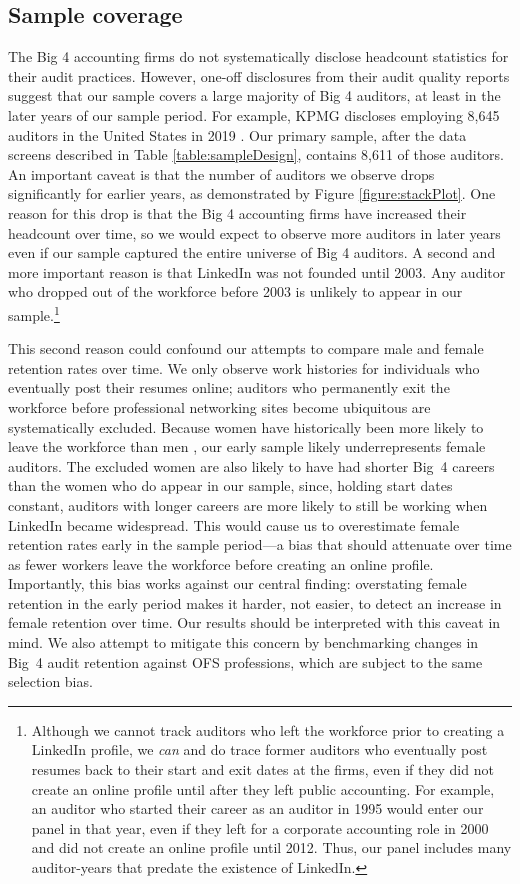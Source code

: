\documentclass[11pt]{article}
\begin{document}
    \subsection{Sample coverage}\label{section:sampleCoverage}
        The Big 4 accounting firms do not systematically disclose headcount statistics for their audit practices. However, one-off disclosures from their audit quality reports suggest that our sample covers a large majority of Big 4 auditors, at least in the later years of our sample period. For example, KPMG discloses employing 8,645 auditors in the United States in 2019 \parencite{kpmg2022ApproachAudit2022}. Our primary sample, after the data screens described in Table \ref{table:sampleDesign}, contains 8,611 of those auditors. An important caveat is that the number of auditors we observe drops significantly for earlier years, as demonstrated by Figure \ref{figure:stackPlot}. One reason for this drop is that the Big 4 accounting firms have increased their headcount over time, so we would expect to observe more auditors in later years even if our sample captured the entire universe of Big 4 auditors. A second and more important reason is that LinkedIn was not founded until 2003. Any auditor who dropped out of the workforce before 2003 is unlikely to appear in our sample.\footnote{Although we cannot track auditors who left the workforce prior to creating a LinkedIn profile, we \textit{can} and do trace former auditors who eventually post resumes back to their start and exit dates at the firms, even if they did not create an online profile until after they left public accounting. For example, an auditor who started their career as an auditor in 1995 would enter our panel in that year, even if they left for a corporate accounting role in 2000 and did not create an online profile until 2012. Thus, our panel includes many auditor-years that predate the existence of LinkedIn.} 
        
        This second reason could confound our attempts to compare male and female retention rates over time. We only observe work histories for individuals who eventually post their resumes online; auditors who permanently exit the workforce before professional networking sites become ubiquitous are systematically excluded. Because women have historically been more likely to leave the workforce than men \parencite{blauFemaleLaborSupply2013}, our early sample likely underrepresents female auditors. The excluded women are also likely to have had shorter Big~4 careers than the women who do appear in our sample, since, holding start dates constant, auditors with longer careers are more likely to still be working when LinkedIn became widespread. This would cause us to overestimate female retention rates early in the sample period---a bias that should attenuate over time as fewer workers leave the workforce before creating an online profile. Importantly, this bias works against our central finding: overstating female retention in the early period makes it harder, not easier, to detect an increase in female retention over time. Our results should be interpreted with this caveat in mind. We also attempt to mitigate this concern by benchmarking changes in Big~4 audit retention against OFS professions, which are subject to the same selection bias.
\end{document}
